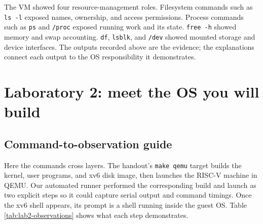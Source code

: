 \documentclass{assets/utmreport}
\begin{document}
The VM showed four resource-management roles. Filesystem commands such as \texttt{ls -l} exposed names, ownership, and access permissions. Process commands such as \texttt{ps} and \texttt{/proc} exposed running work and its state. \texttt{free -h} showed memory and swap accounting. \texttt{df}, \texttt{lsblk}, and \texttt{/dev} showed mounted storage and device interfaces. The outputs recorded above are the evidence; the explanations connect each output to the OS responsibility it demonstrates.

\chapter{Laboratory 2: meet the OS you will build}

\section{Command-to-observation guide}

Here the commands cross layers. The handout's \texttt{make qemu} target builds the kernel, user programs, and xv6 disk image, then launches the RISC-V machine in QEMU. Our automated runner performed the corresponding build and launch as two explicit steps so it could capture serial output and command timings. Once the xv6 shell appears, its prompt is a shell running inside the guest OS. Table \ref{tab:lab2-observations} shows what each step demonstrates.
\end{document}
